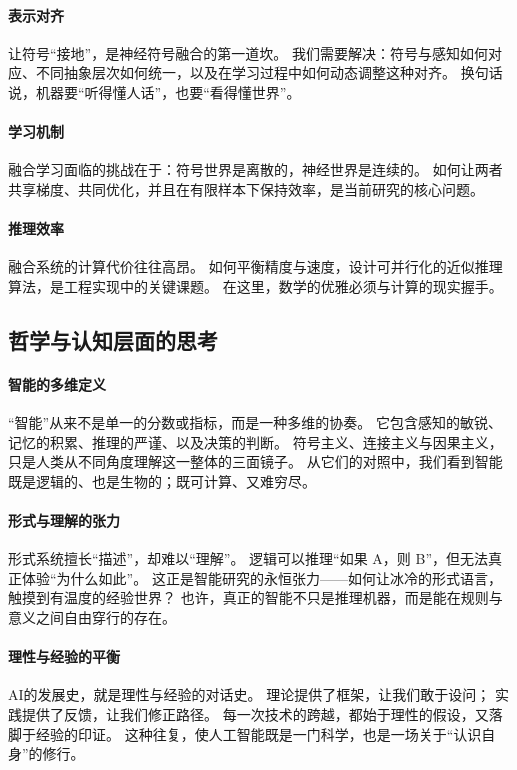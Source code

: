 \paragraph{表示对齐}
让符号“接地”，是神经符号融合的第一道坎。  
我们需要解决：符号与感知如何对应、不同抽象层次如何统一，以及在学习过程中如何动态调整这种对齐。  
换句话说，机器要“听得懂人话”，也要“看得懂世界”。

\paragraph{学习机制}
融合学习面临的挑战在于：符号世界是离散的，神经世界是连续的。  
如何让两者共享梯度、共同优化，并且在有限样本下保持效率，是当前研究的核心问题。

\paragraph{推理效率}
融合系统的计算代价往往高昂。  
如何平衡精度与速度，设计可并行化的近似推理算法，是工程实现中的关键课题。  
在这里，数学的优雅必须与计算的现实握手。

\subsection{哲学与认知层面的思考}

\paragraph{智能的多维定义}
“智能”从来不是单一的分数或指标，而是一种多维的协奏。  
它包含感知的敏锐、记忆的积累、推理的严谨、以及决策的判断。  
符号主义、连接主义与因果主义，只是人类从不同角度理解这一整体的三面镜子。  
从它们的对照中，我们看到智能既是逻辑的、也是生物的；既可计算、又难穷尽。

\paragraph{形式与理解的张力}
形式系统擅长“描述”，却难以“理解”。  
逻辑可以推理“如果 A，则 B”，但无法真正体验“为什么如此”。  
这正是智能研究的永恒张力——如何让冰冷的形式语言，触摸到有温度的经验世界？  
也许，真正的智能不只是推理机器，而是能在规则与意义之间自由穿行的存在。

\paragraph{理性与经验的平衡}
AI的发展史，就是理性与经验的对话史。  
理论提供了框架，让我们敢于设问；  
实践提供了反馈，让我们修正路径。  
每一次技术的跨越，都始于理性的假设，又落脚于经验的印证。  
这种往复，使人工智能既是一门科学，也是一场关于“认识自身”的修行。

